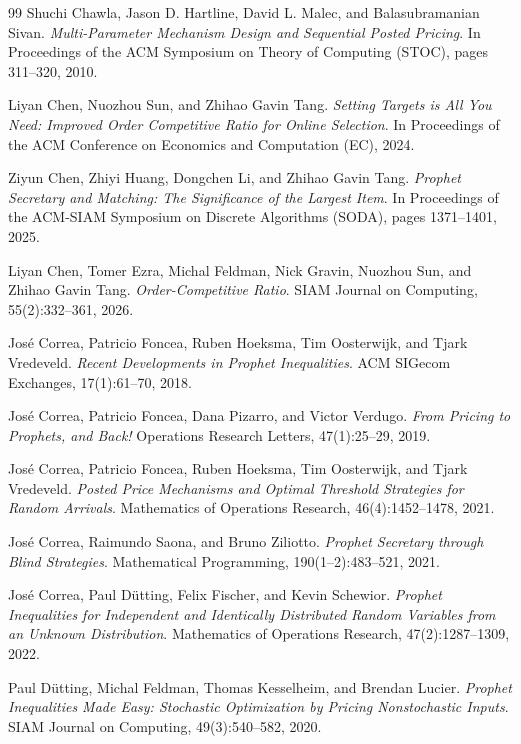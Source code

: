 \documentclass[11pt]{article}
\theoremstyle{definition}
\theoremstyle{remark}
\begin{document}
\begin{thebibliography}{99}
Shuchi Chawla, Jason D. Hartline, David L. Malec, and Balasubramanian Sivan.
\emph{Multi-Parameter Mechanism Design and Sequential Posted Pricing}.
In Proceedings of the ACM Symposium on Theory of Computing (STOC), pages 311--320, 2010.

Liyan Chen, Nuozhou Sun, and Zhihao Gavin Tang.
\emph{Setting Targets is All You Need: Improved Order Competitive Ratio for Online Selection}.
In Proceedings of the ACM Conference on Economics and Computation (EC), 2024.

Ziyun Chen, Zhiyi Huang, Dongchen Li, and Zhihao Gavin Tang.
\emph{Prophet Secretary and Matching: The Significance of the Largest Item}.
In Proceedings of the ACM-SIAM Symposium on Discrete Algorithms (SODA), pages 1371--1401, 2025.

Liyan Chen, Tomer Ezra, Michal Feldman, Nick Gravin, Nuozhou Sun, and Zhihao Gavin Tang.
\emph{Order-Competitive Ratio}.
SIAM Journal on Computing, 55(2):332--361, 2026.

Jos\'e Correa, Patricio Foncea, Ruben Hoeksma, Tim Oosterwijk, and Tjark Vredeveld.
\emph{Recent Developments in Prophet Inequalities}.
ACM SIGecom Exchanges, 17(1):61--70, 2018.

Jos\'e Correa, Patricio Foncea, Dana Pizarro, and Victor Verdugo.
\emph{From Pricing to Prophets, and Back!}
Operations Research Letters, 47(1):25--29, 2019.

Jos\'e Correa, Patricio Foncea, Ruben Hoeksma, Tim Oosterwijk, and Tjark Vredeveld.
\emph{Posted Price Mechanisms and Optimal Threshold Strategies for Random Arrivals}.
Mathematics of Operations Research, 46(4):1452--1478, 2021.

Jos\'e Correa, Raimundo Saona, and Bruno Ziliotto.
\emph{Prophet Secretary through Blind Strategies}.
Mathematical Programming, 190(1--2):483--521, 2021.

Jos\'e Correa, Paul D\"utting, Felix Fischer, and Kevin Schewior.
\emph{Prophet Inequalities for Independent and Identically Distributed Random Variables from an Unknown Distribution}.
Mathematics of Operations Research, 47(2):1287--1309, 2022.

Paul D\"utting, Michal Feldman, Thomas Kesselheim, and Brendan Lucier.
\emph{Prophet Inequalities Made Easy: Stochastic Optimization by Pricing Nonstochastic Inputs}.
SIAM Journal on Computing, 49(3):540--582, 2020.


\end{thebibliography}
\end{document}

